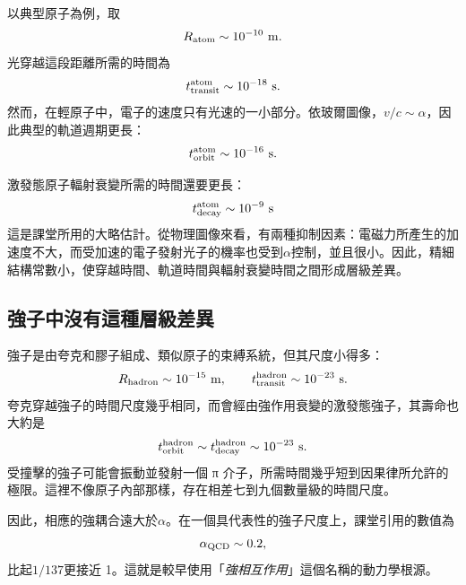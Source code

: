 以典型原子為例，取
\begin{equation}
R_{\rm atom}\sim10^{-10}\ {\rm m}.
\end{equation}
光穿越這段距離所需的時間為
\begin{equation}
t_{\rm transit}^{\rm atom}\sim10^{-18}\ {\rm s}.
\end{equation}
然而，在輕原子中，電子的速度只有光速的一小部分。依玻爾圖像，\(v/c\sim\alpha\)，因此典型的軌道週期更長：
\begin{equation}
t_{\rm orbit}^{\rm atom}\sim10^{-16}\ {\rm s}.
\end{equation}

激發態原子輻射衰變所需的時間還要更長：
\begin{equation}
t_{\rm decay}^{\rm atom}\sim10^{-9}\ {\rm s}
\end{equation}
這是課堂所用的大略估計。從物理圖像來看，有兩種抑制因素：電磁力所產生的加速度不大，而受加速的電子發射光子的機率也受到\(\alpha\)控制，並且很小。因此，精細結構常數小，使穿越時間、軌道時間與輻射衰變時間之間形成層級差異。

\subsection{強子中沒有這種層級差異}

強子是由夸克和膠子組成、類似原子的束縛系統，但其尺度小得多：
\begin{equation}
R_{\rm hadron}\sim10^{-15}\ {\rm m},
\qquad
t_{\rm transit}^{\rm hadron}\sim10^{-23}\ {\rm s}.
\end{equation}
夸克穿越強子的時間尺度幾乎相同，而會經由強作用衰變的激發態強子，其壽命也大約是
\begin{equation}
t_{\rm orbit}^{\rm hadron}
\sim t_{\rm decay}^{\rm hadron}
\sim10^{-23}\ {\rm s}.
\end{equation}
受撞擊的強子可能會振動並發射一個 {\proseunicodefont π} 介子，所需時間幾乎短到因果律所允許的極限。這裡不像原子內部那樣，存在相差七到九個數量級的時間尺度。

\begin{classroomqa}
\end{classroomqa}

因此，相應的強耦合遠大於\(\alpha\)。在一個具代表性的強子尺度上，課堂引用的數值為
\begin{equation}
\alpha_{\rm QCD}\sim0.2,
\end{equation}
比起\(1/137\)更接近 1。這就是較早使用「\emph{強相互作用}」這個名稱的動力學根源。

